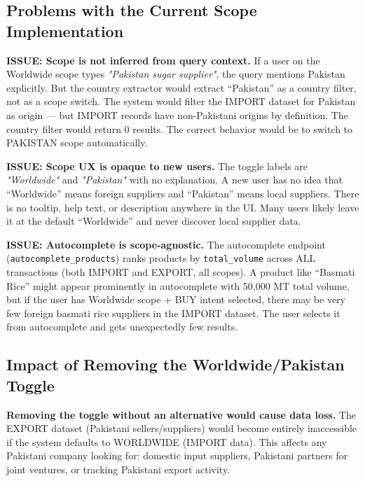 \documentclass[12pt,a4paper]{article}
\begin{document}
\subsection{Problems with the Current Scope Implementation}

\begin{issueBox}
\textbf{ISSUE: Scope is not inferred from query context.}
If a user on the Worldwide scope types \textit{"Pakistan sugar supplier"}, the query
mentions Pakistan explicitly. But the country extractor would extract ``Pakistan'' as
a country filter, not as a scope switch. The system would filter the IMPORT dataset
for Pakistan as origin --- but IMPORT records have non-Pakistani origins by definition.
The country filter would return 0 results. The correct behavior would be to switch
to PAKISTAN scope automatically.
\end{issueBox}

\begin{issueBox}
\textbf{ISSUE: Scope UX is opaque to new users.}
The toggle labels are \textit{"Worldwide"} and \textit{"Pakistan"} with no explanation.
A new user has no idea that ``Worldwide'' means foreign suppliers and ``Pakistan'' means
local suppliers. There is no tooltip, help text, or description anywhere in the UI.
Many users likely leave it at the default ``Worldwide'' and never discover local supplier data.
\end{issueBox}

\begin{issueBox}
\textbf{ISSUE: Autocomplete is scope-agnostic.}
The autocomplete endpoint (\texttt{autocomplete\_products}) ranks products by
\texttt{total\_volume} across ALL transactions (both IMPORT and EXPORT, all scopes).
A product like ``Basmati Rice'' might appear prominently in autocomplete with 50,000 MT
total volume, but if the user has Worldwide scope + BUY intent selected, there may be
very few foreign basmati rice suppliers in the IMPORT dataset. The user selects it from
autocomplete and gets unexpectedly few results.
\end{issueBox}

\subsection{Impact of Removing the Worldwide/Pakistan Toggle}

\begin{issueBox}
\textbf{Removing the toggle without an alternative would cause data loss.}
The EXPORT dataset (Pakistani sellers/suppliers) would become entirely inaccessible
if the system defaults to WORLDWIDE (IMPORT data). This affects any Pakistani company
looking for: domestic input suppliers, Pakistani partners for joint ventures, or
tracking Pakistani export activity.
\end{issueBox}
\end{document}
